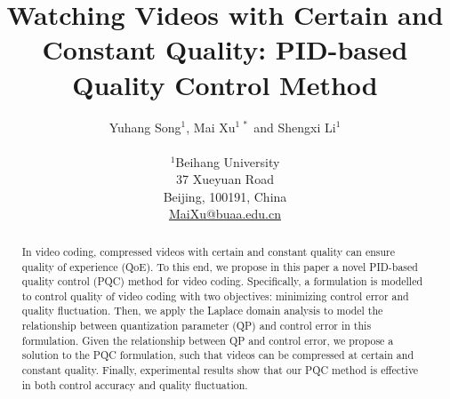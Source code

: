 \documentclass[smallabstract,smallcaptions]{dccpaper}
\begin{document}
\newcommand{\argmin}{\operatornamewithlimits{argmin}}

\title
{\large
\textbf{Watching Videos with Certain and Constant Quality: PID-based Quality Control Method}
}


\author{%
Yuhang Song$^{1}$, Mai Xu$^{1~*}$ and Shengxi Li$^{1}$\\[0.5em]
{\small\begin{minipage}{\linewidth}\begin{center}
\begin{tabular}{ccc}
$^{1}$Beihang University & \hspace*{0.5in} \\
37 Xueyuan Road \\
Beijing, 100191, China \\
\url{MaiXu@buaa.edu.cn}
\end{tabular}
\end{center}\end{minipage}}
}


\maketitle
\thispagestyle{empty}



\begin{abstract}

In video coding, compressed videos with certain and constant quality can ensure quality of experience (QoE). To this end, we propose in this paper a novel PID-based quality control (PQC) method for video coding. Specifically, a formulation is modelled to control quality of video coding with two objectives: minimizing control error and quality fluctuation. Then, we apply the Laplace domain analysis to model the relationship between quantization parameter (QP) and control error in this formulation. Given the relationship between QP and control error, we propose a solution to the PQC formulation, such that videos can be compressed at certain and constant quality. Finally, experimental results show that our PQC method is effective in both control accuracy and quality fluctuation.
\end{abstract}
\vspace{-1.0em}
\end{document}
